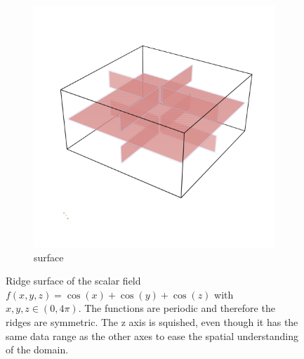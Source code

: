 \begin{figure}
\begin{subfigure}[b]{0.49\textwidth}
        \includegraphics[width=\textwidth]{Images/ridge.png}
        \caption{surface}
    \end{subfigure}
    \caption{Ridge surface of the scalar field $f(x,y,z)=\cos(x)+\cos(y)
    +\cos(z)$ with $x,y,z \in (0, 4\pi)$. The functions are periodic and
    therefore the ridges are symmetric. The z axis is squished, even though
    it has the same data range as the other axes to ease the spatial
    understanding of the domain.}
    \label{fig:ridge}
\end{figure}
